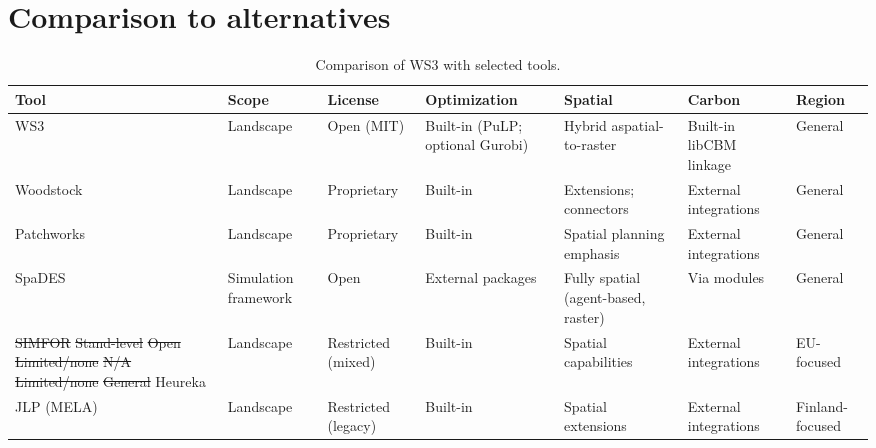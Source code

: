\documentclass[review]{elsarticle}
\providecommand{\DIFdeltex}[1]{{\protect\color{red}\sout{#1}}}                      %
\providecommand{\DIFdelFL}[1]{\DIFdel{#1}} %
\providecommand{\DIFdelbeginFL}{} %
\providecommand{\DIFdelendFL}{} %
\providecommand{\DIFdel}[1]{\texorpdfstring{\DIFdeltex{#1}}{}} %
\newcommand{\DIFscaledelfig}{0.5}
\newlength{\DIFdelgraphicswidth} %
\newlength{\DIFdelgraphicsheight} %
\newcommand{\DIFdelincludegraphics}[2][]{%
\sbox{\DIFdelgraphicsbox}{\DIFOincludegraphics[#1]{#2}}%
\settoboxwidth{\DIFdelgraphicswidth}{\DIFdelgraphicsbox} %
\settoboxtotalheight{\DIFdelgraphicsheight}{\DIFdelgraphicsbox} %
\scalebox{\DIFscaledelfig}{%
\parbox[b]{\DIFdelgraphicswidth}{\usebox{\DIFdelgraphicsbox}\\[-\baselineskip] \rule{\DIFdelgraphicswidth}{0em}}\llap{\resizebox{\DIFdelgraphicswidth}{\DIFdelgraphicsheight}{%
\setlength{\unitlength}{\DIFdelgraphicswidth}%
\begin{picture}(1,1)%
\thicklines\linethickness{2pt} %
{\color[rgb]{1,0,0}\put(0,0){\framebox(1,1){}}}%
{\color[rgb]{1,0,0}\put(0,0){\line( 1,1){1}}}%
{\color[rgb]{1,0,0}\put(0,1){\line(1,-1){1}}}%
\end{picture}%
}\hspace*{3pt}}} %
} %
\DeclareRobustCommand{\DIFdelbeginFL}{\DIFOdelbeginFL \let\includegraphics\DIFdelincludegraphics} %
\DeclareRobustCommand{\DIFdelendFL}{\DIFOaddendFL \let\includegraphics\DIFOincludegraphics} %
\begin{document}
\section{Comparison to alternatives}

\begin{table}[h]
  \centering
  \caption{Comparison of WS3 with selected tools.}
  \begingroup
  \setlength{\tabcolsep}{3pt}
  \renewcommand{\arraystretch}{0.92}
  \footnotesize
  \begin{tabular}{p{2.4cm}p{2.1cm}p{1.5cm}p{2.0cm}p{2.0cm}p{1.9cm}p{1.9cm}}
  \toprule
  Tool & Scope & License & Optimization & Spatial & Carbon & Region \\
  \midrule
  WS3 & Landscape & Open (MIT) & Built-in (PuLP; optional Gurobi) & Hybrid aspatial-to-raster & Built-in libCBM linkage & General \\
  Woodstock & Landscape & Proprietary & Built-in & Extensions; connectors & External integrations & General \\
  Patchworks & Landscape & Proprietary & Built-in & Spatial planning emphasis & External integrations & General \\
  SpaDES & Simulation framework & Open & External packages & Fully spatial (agent-based, raster) & Via modules & General \\
  \DIFdelbeginFL \DIFdelFL{SIMFOR }%
\DIFdelFL{Stand-level }%
\DIFdelFL{Open }%
\DIFdelFL{Limited/none }%
\DIFdelFL{N/A }%
\DIFdelFL{Limited/none }%
\DIFdelFL{General }%
\DIFdelendFL Heureka & Landscape & Restricted (mixed) & Built-in & Spatial capabilities & External integrations & EU-focused \\
  JLP (MELA) & Landscape & Restricted (legacy) & Built-in & Spatial extensions & External integrations & Finland-focused \\
  \bottomrule
  \end{tabular}
  \endgroup
\end{table}
\end{document}
